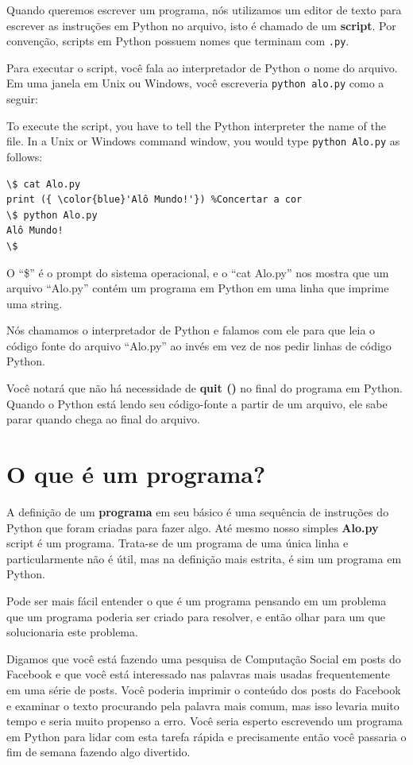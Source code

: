 Quando queremos escrever um programa, 
nós utilizamos um editor de texto para escrever as instruções em Python no arquivo, isto é chamado de um {\bf script}. Por convenção, scripts em Python possuem nomes que terminam com {\tt .py}.


Para executar o script, você fala ao interpretador de Python o nome do arquivo. Em uma janela em Unix ou Windows, você escreveria  {\tt python alo.py} como a seguir:


To execute the script, you have to tell the Python interpreter 
the name of the file.  In a Unix or Windows command window, 
you would type {\tt python Alo.py} as follows:


\begin{verbatim}
\$ cat Alo.py
print ({ \color{blue}'Alô Mundo!'}) %Concertar a cor 
\$ python Alo.py
Alô Mundo!
\$
\end{verbatim}

%

O ``\$''  é o prompt do sistema operacional, e o ``cat Alo.py'' nos mostra que um arquivo ``Alo.py'' contém um programa em Python em uma linha que imprime uma string.

Nós chamamos o interpretador de Python e falamos com ele para que leia o código fonte do arquivo  ``Alo.py'' ao invés em vez de nos pedir linhas de código Python.

Você notará que não há necessidade de {\bf quit ()} no final do programa em Python. Quando o Python está lendo seu código-fonte
a partir de um arquivo, ele sabe parar quando chega ao final do arquivo.


\section{O que é um programa?} %

A definição de um  {\bf programa} em seu básico é uma sequência de instruções do Python que foram criadas para fazer algo. Até mesmo nosso simples  {\bf Alo.py} script é um programa. Trata-se de um programa de uma única linha e particularmente não é útil, mas na definição mais estrita, é sim um programa em Python.

Pode ser mais fácil entender o que é um programa pensando em um problema que um programa poderia ser criado para resolver, e então olhar para um que solucionaria este problema.

Digamos que você está fazendo uma pesquisa de Computação Social em posts do Facebook e que você está interessado nas palavras mais usadas frequentemente em uma série de posts. Você poderia imprimir o conteúdo dos posts do Facebook e examinar o texto procurando pela palavra mais comum, mas isso levaria muito tempo e seria muito propenso a erro. Você seria esperto escrevendo um programa em Python para lidar com esta tarefa rápida e precisamente então você passaria o fim de semana fazendo algo divertido.

